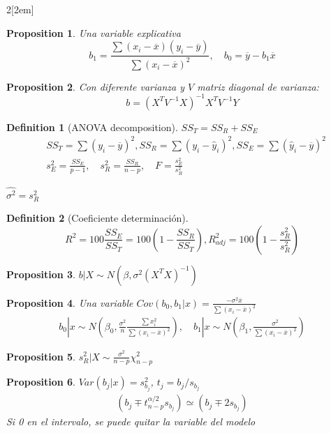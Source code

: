 \documentclass[leqno]{article}
\newtheorem*{proposition}{Proposition}
\newtheorem*{definition}{Definition}
\begin{document}
\begin{multicols}{2}[\columnsep2em]
\begin{proposition} Una variable explicativa
\[
b_1 = \frac{\sum (x_i-\overline{x})(y_i-\overline{y})}{\sum (x_i-\overline{x})^2}, \quad b_0 = \overline{y} - b_1 \overline{x}
\]  
\end{proposition}

\begin{proposition} Con diferente varianza y $V$ matriz diagonal de varianza:
\[
b = (X^TV^{-1}X)^{-1}X^TV^{-1}Y
\] 
\end{proposition}

\begin{definition}[ANOVA decomposition] $SS_T = SS_R + SS_E$
  \begin{align*}
  & SS_T = \sum (y_i - \overline{y})^2, SS_R = \sum (y_i-\hat{y}_i)^2, SS_E = \sum (\hat{y}_i-\overline{y})^2 \\
  & s_E^2 = \frac{SS_E}{p-1}, \quad s_R^2 = \frac{SS_R}{n-p}, \quad F = \frac{s_E^2}{s_R^2}
  \end{align*}
\end{definition}

$\hat{\sigma^2} = s_R^2$

\begin{definition}[Coeficiente determinación]
  \[
  R^2 = 100 \frac{SS_E}{SS_T} = 100(1-\frac{SS_R}{SS_T}), R_{adj}^2 = 100(1- \frac{s_R^2}{s_R^2}) 
  \] 
\end{definition}

\begin{proposition} $b|X \sim N(\beta , \sigma^2(X^TX)^{-1})$
\end{proposition}

\begin{proposition} Una variable $Cov(b_0, b_1|x) = \frac{-\sigma ^2 \overline{x}}{\sum (x_i- \overline{x})^2}$
\begin{align*}
  b_0|x \sim  N(\beta_0, \frac{\sigma ^2}{n} \frac{\sum x_i^2}{\sum (x_i- \overline{x})^2}), \quad
  b_1|x \sim  N(\beta_1, \frac{\sigma ^2}{\sum (x_i- \overline{x})^2})
\end{align*} 
\end{proposition}

\begin{proposition} $s_R^2 |X \sim \frac{\sigma^2 }{n-p}\chi ^2_{n-p}$ 
\end{proposition}

\begin{proposition} $Var(b_j|x) = s_{b_j}^2$, $t_j = b_j / s_{b_j}$
  \begin{align*}
	(b_j \mp t_{n-p}^{\alpha / 2} s_{b_j}) \simeq  (b_j \mp 2 s_{b_j})
  \end{align*}
Si 0 en el intervalo, se puede quitar la variable del modelo
\end{proposition}


\end{multicols}
\end{document}
